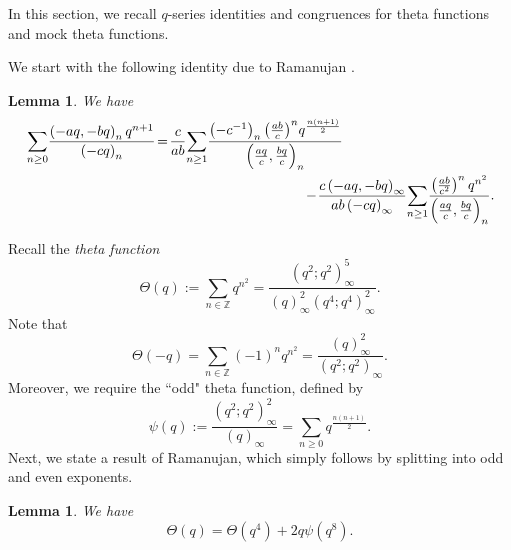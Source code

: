 \documentclass[12pt,reqno]{amsart}
\renewcommand{\(}{\left\(}
\renewcommand{\)}{\right\)}
\newcommand{\pa}[2]{\left(\frac{#1}{#2}\right)}
\numberwithin{equation}{section}
\theoremstyle{plain}
\newtheorem{lemma}[theorem]{Lemma}
\theoremstyle{definition}
\numberwithin{equation}{section}
\begin{document}
In this section, we recall $q$-series identities and congruences for theta functions and mock theta functions.

We start with the following identity due to Ramanujan \cite[equation (3.17)$_\text{R}$]{A0}.


\begin{lemma}\label{lemident1} 
	We have %
	\begin{align*}
	&\sum_{n\ge 0}\!\frac{\left(-aq,-bq\right)_nq^{n+1}}{\left(-cq\right)_n}\!
	=\!\frac{c}{ab}\!\sum_{n\ge 1}\!\frac{\left(-c^{-1}\right)_n \pa{ab}{c}^n\! q^{\frac{n(n+1)}{2}}}{\left(\frac{aq}{c},\frac{bq}{c}\right)_n}\\
	&\hspace{7 cm}-\!\frac{c\left(-aq,-bq\right)_{\infty}}{ab\left(-cq\right)_{\infty}}\!\sum_{n\ge 1}\!\frac{\pa{ab}{c^2}^nq^{n^2}}{\left(\frac{aq}{c},\frac{bq}{c}\right)_n}.%
	\end{align*}
\end{lemma}

Recall the {\it theta function} %
\begin{equation}\label{theta}
\Theta(q):=\sum_{n\in \mathbb{Z}}q^{n^2}=\frac{\left(q^2;q^2\right)^5_{\infty}}{(q)^2_{\infty}\left(q^4;q^4\right)^2_{\infty}}.
\end{equation}
Note that
\begin{equation}\label{thetas}
\Theta(-q)=\sum_{n\in \mathbb{Z}}(-1)^nq^{n^2}=\frac{(q)^2_{\infty}}{\left(q^2;q^2\right)_{\infty}}.
\end{equation}
Moreover, we require the ``odd" theta function, defined by 
\begin{equation}\label{psi}
\psi(q):=\frac{\left(q^2;q^2\right)^2_{\infty}}{\left(q\right)_{\infty}}=\sum_{n\ge 0}q^{\frac{n(n+1)}{2}}.
\end{equation}
Next, we state a result of Ramanujan, which simply follows by splitting into odd and even exponents.
\begin{lemma}\label{thetadissection}
	We have
	\[
	\Theta(q)=\Theta\left(q^4\right)+2q\psi\!\left(q^8\right).
	\]
\end{lemma} 
\end{document}
